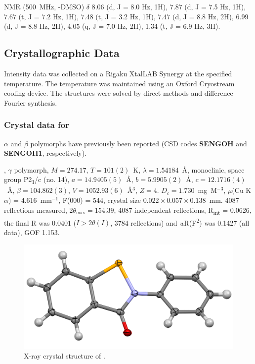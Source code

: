 \begin{refsection}
 NMR (500~MHz, -DMSO) $ \delta $ 8.06 (d, J = 8.0 Hz, 1H), 7.87 (d, J = 7.5 Hz, 1H), 7.67 (t, J = 7.2 Hz, 1H), 7.48 (t, J = 3.2 Hz, 1H), 7.47 (d, J = 8.8 Hz, 2H), 6.99 (d, J = 8.8 Hz, 2H), 4.05 (q, J = 7.0 Hz, 2H), 1.34 (t, J = 6.9 Hz, 3H).


\subsection{Crystallographic Data}
Intensity data was collected on a Rigaku XtalLAB Synergy at the specified temperature. The temperature was maintained using an Oxford Cryostream cooling device. The structures were solved by direct methods and difference Fourier synthesis.\autocite{Sheldrick2015}


\subsubsection{Crystal data for \texorpdfstring{}{C13 H9 N O Se}}
$\alpha$ and $\beta$ polymorphs have previously been reported (CSD codes \textbf{SENGOH} and \textbf{SENGOH1}, respectively).\autocite{Dupont1990StructuresII}

, $\gamma$ polymorph, $M=274.17$, $T=101(2)$~K, $\lambda=1.54184$~\AA, monoclinic, space group P2\textsubscript{1}/c (no. 14), $a = 14.9405(5)$~\AA, $b = 5.9905(2)$~\AA, $c = 12.1716(4)$~\AA, $\beta = 104.862(3)$\degree, $V = 1052.93(6)$~\AA$^{3}$, $Z = 4$. $D_{c}= 1.730$~mg~M$^{-3}$, $\mu$(Cu K$\alpha$) = 4.616~mm$^{-1}$, F(000) = 544, crystal size $0.022 \times 0.057 \times 0.138$~mm. 4087 reflections measured, $2\theta_{\max}=154.39$\degree, 4087 independent reflections, R\textsubscript{int} = 0.0626, the final R was 0.0401 ($I > 2\theta(I)$, 3784 reflections) and \textit{w}R(F\textsuperscript{2}) was 0.1427 (all data), GOF 1.153.

\begin{figure}
  \includegraphics[width=0.6\linewidth]{Figures/ebs-xtal.pdf}
  \caption{X-ray crystal structure of \texorpdfstring{}{C13 H9 N O Se}.}
\end{figure}


\end{refsection}
